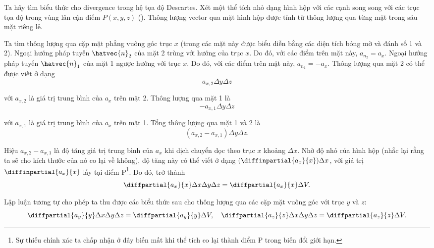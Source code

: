 Ta hãy tìm biểu thức cho divergence trong hệ tọa độ Descartes. Xét một thể tích nhỏ dạng hình hộp với các cạnh song song với các trục tọa độ trong vùng lân cận điểm $P(x, y, z)$ (). Thông lượng vector qua mặt hình hộp được tính từ thông lượng qua từng mặt trong sáu mặt riêng lẻ.

Ta tìm thông lượng qua cặp mặt phẳng vuông góc trục $x$ (trong  các mặt này được biểu diễn bằng các diện tích bóng mờ và đánh số 1 và 2). Ngoại hướng pháp tuyến $\hatvec{n}_2$ của mặt 2 trùng với hướng của trục $x$. Do đó, với các điểm trên mặt này, $a_{n_2}=a_x$. Ngoại hướng pháp tuyến $\hatvec{n}_1$ của mặt 1 ngược hướng với trục $x$. Do đó, với các điểm trên mặt này, $a_{n_1}=-a_x$. Thông lượng qua mặt 2 có thể được viết ở dạng
\begin{equation*}
	a_{x,2}\Delta{y}\Delta{z}
\end{equation*}

\noindent
với $a_{x,2}$ là giá trị trung bình của $a_x$ trên mặt 2. Thông lượng qua mặt 1 là
\begin{equation*}
	- a_{x,1}\Delta{y}\Delta{z}
\end{equation*}

\noindent
với $a_{x,1}$ là giá trị trung bình của $a_x$ trên mặt 1. Tổng thông lượng qua mặt 1 và 2 là
\begin{equation}\label{eq:1_80}
	(a_{x,2} - a_{x,1}) \Delta{y}\Delta{z}.
\end{equation}

Hiệu $a_{x,2}-a_{x,1}$ là độ tăng giá trị trung bình của $a_x$ khi dịch chuyển dọc theo trục $x$ khoảng $\Delta{x}$. Nhờ độ nhỏ của hình hộp (nhắc lại rằng ta sẽ cho kích thước của nó co lại về không), độ tăng này có thể viết ở dạng $(\diffinpartial{a_x}{x})\Delta{x}$, với giá trị $\diffinpartial{a_x}{x}$ lấy tại điểm P\footnote{Sự thiếu chính xác ta chấp nhận ở đây biến mất khi thể tích co lại thành điểm P trong biến đổi giới hạn.}. Do đó,  trở thành
\begin{equation*}
	\diffpartial{a_x}{x}\Delta{x}\Delta{y}\Delta{z} = \diffpartial{a_x}{x}\Delta{V}.
\end{equation*}

\noindent
Lập luận tương tự cho phép ta thu được các biểu thức sau cho thông lượng qua các cặp mặt vuông góc với trục $y$ và $z$:
\begin{equation*}
	\diffpartial{a_y}{y}\Delta{x}\Delta{y}\Delta{z} = \diffpartial{a_y}{y}\Delta{V},\quad \diffpartial{a_z}{z}\Delta{x}\Delta{y}\Delta{z} = \diffpartial{a_z}{z}\Delta{V}.
\end{equation*}

